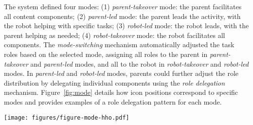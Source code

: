 The system defined four modes: (1) \textit{parent-takeover} mode: the parent facilitates all content components; (2) \textit{parent-led} mode: the parent leads the activity, with the robot helping with specific tasks; (3) \textit{robot-led} mode: the robot leads, with the parent helping as needed; (4) \textit{robot-takeover} mode: the robot facilitates all components. The \textit{mode-switching} mechanism automatically adjusted the task roles based on the selected mode, assigning all roles to the parent in \textit{parent-takeover} and \textit{parent-led} modes, and all to the robot in \textit{robot-takeover} and \textit{robot-led} modes. In \textit{parent-led} and \textit{robot-led} modes, parents could further adjust the role distribution by delegating individual components using the \textit{role delegation} mechanism. Figure~\ref{fig:mode} details how icon positions correspond to specific modes and provides examples of a role delegation pattern for each mode.

\begin{figure*}[t!]
  \texttt{[image: figures/figure-mode-hho.pdf]}
   \vspace{-6pt}
  \caption{Mode-Switching and Role Delegation Mechanisms of the PAiREd system. The system offers four modes: robot takeover, robot-led, parent-led, and parent takeover. Parents can drag their icon to the ``driver,'' ``co-driver,'' or ``exit'' position to select the desired mode. Additionally, they can fine-tune the role delegation by assigning specific tasks to either themselves or the robot.}
  \label{fig:mode}
   \vspace{-6pt}
\end{figure*}


   \vspace*{-3pt}
